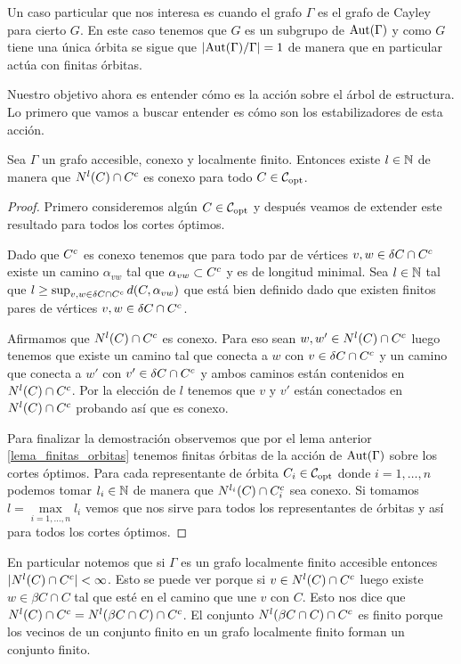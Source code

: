 \documentclass[tesis.tex]{subfiles}
\begin{document}
\begin{obs}
	Un caso particular que nos interesa es cuando el grafo $\Gamma$ es el grafo de Cayley para cierto \fg $G$.
	En este caso tenemos que $G$ es un subgrupo de $\text{Aut}(\Gamma)$ y como $G$ tiene una única órbita se sigue que $|\text{Aut}(\Gamma)/\Gamma| = 1$ de manera que en particular actúa con finitas órbitas.		
\end{obs}

Nuestro objetivo ahora es entender cómo es la acción sobre el árbol de estructura. 
Lo primero que vamos a buscar entender es cómo son los estabilizadores de esta acción.

\begin{lema}\label{lema_nlC_cap_olC_conexo}
	Sea $\Gamma$ un grafo accesible, conexo y localmente finito.
	Entonces existe $l \in \mathbb{N}$ de manera que $N^l(C) \cap C^{c}$ es conexo para todo $C \in {\cal C}_{\text{opt}}$.
\end{lema}
\begin{proof}
	Primero consideremos algún $C \in {\cal C}_{\text{opt}}$ y después veamos de extender este resultado para todos los cortes óptimos.
	
	Dado que $C^{c}$ es conexo tenemos que para todo par de vértices $v,w \in \delta C \cap C^{c}$ existe un camino $\alpha_{vw}$ tal que $\alpha_{vw} \subset C^{c}$ y es de longitud minimal.
	Sea $l \in \mathbb{N}$ tal que $l \ge \sup_{v,w \in \delta C \cap C^{c}} d(C,\alpha_{vw})$ que está bien definido dado que existen finitos pares de vértices $v,w \in \delta C \cap C^{c}$.
	
	Afirmamos que $N^{l}(C) \cap C^{c}$ es conexo.
	Para eso sean $w,w' \in N^{l}(C) \cap C^{c}$ luego tenemos que existe un camino tal que conecta a $w$ con $v  \in \delta C \cap C^{c}$ y un camino que conecta a $w'$ con $v' \in \delta C \cap C^{c}$ y ambos caminos están contenidos en $N^{l}(C) \cap C^{c}$.
	Por la elección de $l$ tenemos que $v$ y $v'$ están conectados en $N^l(C) \cap C^{c}$ probando así que es conexo.
	

	Para finalizar la demostración observemos que por el lema anterior \ref{lema_finitas_orbitas} tenemos finitas órbitas de la acción de $\text{Aut}(\Gamma)$ sobre los cortes óptimos.
	Para cada representante de órbita $C_i \in {\cal C}_{\text{opt}}$ donde $i=1,\dots,n$ podemos tomar $l_i \in \mathbb{N}$ de manera que $ N^{l_{i}}(C_{\textit{}}) \cap C^{c}_{i} $ sea conexo. 
	Si tomamos $l = \underset{{i=1,\dots,n}}{\max} l_i$ vemos que nos sirve para todos los representantes de órbitas y así para todos los cortes óptimos.
	
\end{proof}
\begin{obs}
	En particular notemos que si $\Gamma$ es un grafo localmente finito accesible entonces  $|N^l(C) \cap C^{c}|<\infty$. 
	Esto se puede ver porque si $v \in N^l(C) \cap C^{c}$ luego existe $w \in \beta C \cap C$ tal que esté en el camino que une $v$ con $C$.
	Esto nos dice que $N^l(C) \cap C^{c} = N^l(\beta C  \cap C) \cap C^{c}$. 
	El conjunto $N^l(\beta C  \cap C) \cap C^{c}$ es finito porque los vecinos de un conjunto finito en un grafo localmente finito forman un conjunto finito.
\end{obs}
\end{document}
